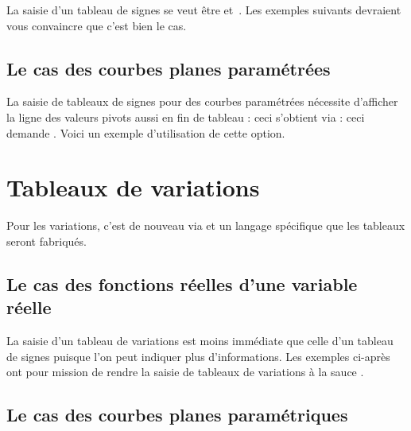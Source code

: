 \documentclass[10pt, a4paper]{article}
\newcommand\thispack{\tdocpack{tns-functab}}
\begin{document}
La saisie d'un tableau de signes se veut être  et \,. Les exemples suivants devraient vous convaincre que c'est bien le cas.



\subsection{Le cas des courbes planes paramétrées}

La saisie de tableaux de signes pour des courbes paramétrées nécessite d'afficher la ligne des valeurs pivots aussi en fin de tableau : ceci s'obtient via  : ceci demande . Voici un exemple d'utilisation de cette option.


\section{Tableaux de variations}

\begin{tdocnote}
	Pour les variations, c'est de nouveau via  et un langage spécifique que les tableaux seront fabriqués.
\end{tdocnote}




\subsection{Le cas des fonctions réelles d'une variable réelle}

La saisie d'un tableau de variations est moins immédiate que celle d'un tableau de signes puisque l'on peut indiquer plus d'informations. Les exemples ci-après ont pour mission de rendre  la saisie de tableaux de variations à la sauce \thispack.



\subsection{Le cas des courbes planes paramétriques}
\end{document}
